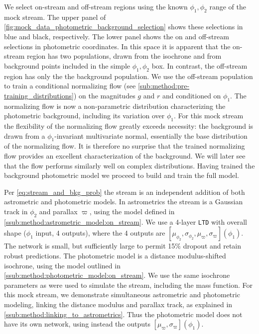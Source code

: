 \documentclass[twocolumn]{aastex631}
\newcommand{\parallax}{\varpi}
\begin{document}
        We select on-stream and off-stream regions using the known $\phi_1,
        \phi_2$ range of the mock stream.  The upper panel of
        \autoref{fig:mock_data_photometric_background_selection} shows these
        selections in blue and black, respectively.  The lower panel shows the
        on and off-stream selections in photometric coordinates.  In this space
        it is apparent that the on-stream region has two populations, drawn from
        the isochrone and from background points included in the simple $\phi_1,
        \phi_2$ box.  In contrast, the off-stream region has only the the
        background population.  We use the off-stream population to train a
        conditional normalizing flow (see
        \autoref{sub:method:pre-training_distributions}) on the magnitudes $g$
        and $r$ and conditioned on $\phi_1$.  The normalizing flow is now a
        non-parametric distribution characterizing the photometric background,
        including its variation over $\phi_1$.  For this mock stream the
        flexibility of the normalizing flow greatly exceeds necessity: the
        background is drawn from a $\phi_1$-invariant multivariate normal,
        essentially the base distribution of the normalizing flow.  It is
        therefore no surprise that the trained normalizing flow provides an
        excellent characterization of the background.  We will later see that
        the flow performs similarly well on complex distributions.  Having
        trained the background photometric model we proceed to build and train
        the full model.

        Per \autoref{eq:stream_and_bkg_prob} the stream is an independent
        addition of both astrometric and photometric models.  In astrometrics
        the stream is a Gaussian track in $\phi_2$ and parallax $\parallax$,
        using the model defined in
        \autoref{ssub:method:astrometric_model:on_stream}.  We use a 4-layer
        \texttt{LTD} with overall shape ($\phi_1$ input, 4 outputs), where the 4
        outputs are $[\mu_{\phi_2}, \sigma_{\phi_2}, \mu_{\parallax},
        \sigma_{\parallax}](\phi_1)$.  The network is small, but sufficiently
        large to permit 15\% dropout and retain robust predictions.  The
        photometric model is a distance modulus-shifted isochrone, using the
        model outlined in  \autoref{ssub:method:photometric_model:on_stream}. We
        use the same isochrone parameters as were used to simulate the stream,
        including the \citep{GrillmairSmith2001} mass function.  For this mock
        stream, we demonstrate simultaneous astrometric and photometric
        modeling, linking the distance modulus and parallax track, as explained
        in \autoref{ssub:method:linking_to_astrometrics}. Thus the photometric
        model does not have its own network, using instead the outputs
        $[\mu_{\parallax}, \sigma_{\parallax}](\phi_1)$.
\end{document}
